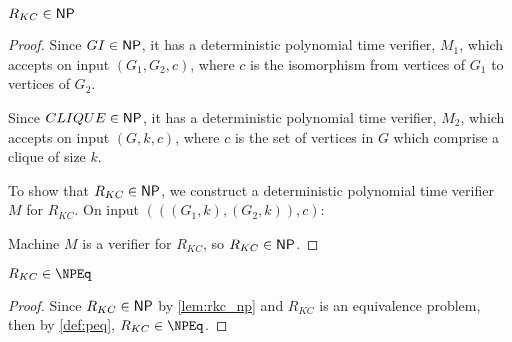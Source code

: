 \begin{lemma}\label{lem:rkc_np}$R_{KC}\in{\ensuremath{\mathsf{NP}}}$\end{lemma}
\begin{proof}
  Since $GI\in{\ensuremath{\mathsf{NP}}}$, it has a deterministic polynomial time verifier, $M_1$,
  which accepts on input $(G_1, G_2, c)$, where $c$ is the isomorphism from
  vertices of $G_1$ to vertices of $G_2$.

  Since $CLIQUE\in{\ensuremath{\mathsf{NP}}}$, it has a deterministic polynomial time verifier, $M_2$,
  which accepts on input $(G, k, c)$, where $c$ is the set of vertices in $G$
  which comprise a clique of size $k$.

  To show that $R_{KC}\in{\ensuremath{\mathsf{NP}}}$, we construct a deterministic polynomial time
  verifier $M$ for $R_{KC}$. On input $(((G_1, k), (G_2, k)), c)$:\\
  \begin{algorithm}[H]
  \end{algorithm}
  
  Machine $M$ is a verifier for $R_{KC}$, so $R_{KC}\in{\ensuremath{\mathsf{NP}}}$.
\end{proof}

\begin{corollary}\label{cor:rkc_npeq}$R_{KC}\in\NPEq$\end{corollary}
\begin{proof}Since $R_{KC}\in{\ensuremath{\mathsf{NP}}}$ by \autoref{lem:rkc_np} and $R_{KC}$ is an
  equivalence problem, then by \autoref{def:peq}, $R_{KC}\in\NPEq$.\end{proof}

